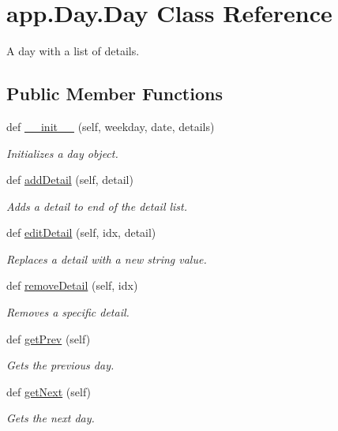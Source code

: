 \hypertarget{classapp_1_1Day_1_1Day}{}\section{app.\+Day.\+Day Class Reference}
\label{classapp_1_1Day_1_1Day}


A day with a list of details.  


\subsection*{Public Member Functions}
\begin{DoxyCompactItemize}
\item 
def \hyperlink{classapp_1_1Day_1_1Day_a976cc9e6313247be8da7a45c9ed221a1}{\+\_\+\+\_\+init\+\_\+\+\_\+} (self, weekday, date, details)
\begin{DoxyCompactList}\small\item\em Initializes a day object. \end{DoxyCompactList}\item 
def \hyperlink{classapp_1_1Day_1_1Day_ada42cf0b2378c6ce639a62324db7b87c}{add\+Detail} (self, detail)
\begin{DoxyCompactList}\small\item\em Adds a detail to end of the detail list. \end{DoxyCompactList}\item 
def \hyperlink{classapp_1_1Day_1_1Day_adf6f3737b59a1f82eb3ec2f1b9bb00a1}{edit\+Detail} (self, idx, detail)
\begin{DoxyCompactList}\small\item\em Replaces a detail with a new string value. \end{DoxyCompactList}\item 
def \hyperlink{classapp_1_1Day_1_1Day_a67aa22e13dfde0424c3a552cb1932bd3}{remove\+Detail} (self, idx)
\begin{DoxyCompactList}\small\item\em Removes a specific detail. \end{DoxyCompactList}\item 
def \hyperlink{classapp_1_1Day_1_1Day_a01f8d1b7d230c920f93164ab55f832cc}{get\+Prev} (self)
\begin{DoxyCompactList}\small\item\em Gets the previous day. \end{DoxyCompactList}\item 
def \hyperlink{classapp_1_1Day_1_1Day_ad22db62f8baf4aa6191769f2fcf07255}{get\+Next} (self)
\begin{DoxyCompactList}\small\item\em Gets the next day. \end{DoxyCompactList}\end{DoxyCompactItemize}
